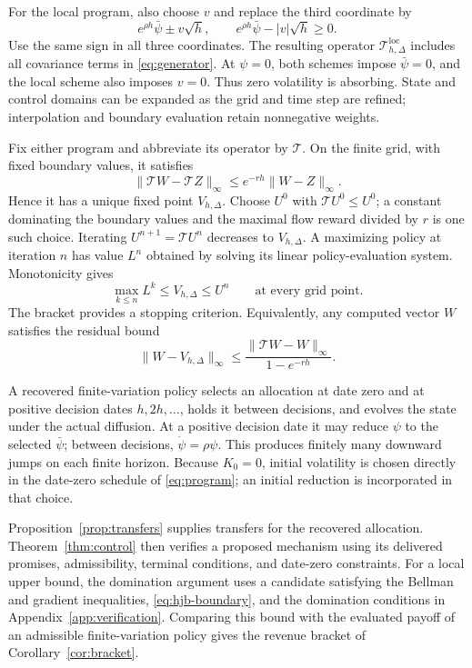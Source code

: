 \documentclass[12pt]{article}
\begin{document}
For the local program, also choose \(v\) and replace the third
coordinate by
\[
  e^{\rho h}\bar\psi\pm v\sqrt h,
  \qquad
  e^{\rho h}\bar\psi-|v|\sqrt h\geq0 .
\]
Use the same sign in all three coordinates. The resulting operator
\(\mathcal T_{h,\Delta}^{\mathrm{loc}}\) includes all covariance terms
in \eqref{eq:generator}. At \(\psi=0\), both schemes impose
\(\bar\psi=0\), and the local scheme also imposes \(v=0\).
Thus zero volatility is absorbing. State and control domains can be
expanded as the grid and time step are refined; interpolation and
boundary evaluation retain nonnegative weights.

Fix either program and abbreviate its operator by \(\mathcal T\).
On the finite grid, with fixed boundary values, it satisfies
\[
  \|\mathcal T W-\mathcal T Z\|_\infty
    \leq e^{-rh}\|W-Z\|_\infty .
\]
Hence it has a unique fixed point \(V_{h,\Delta}\).
Choose \(U^0\) with \(\mathcal T U^0\leq U^0\); a constant dominating
the boundary values and the maximal flow reward divided by \(r\)
is one such choice. Iterating
\(U^{n+1}=\mathcal T U^n\) decreases to \(V_{h,\Delta}\).
A maximizing policy at iteration \(n\) has value \(L^n\) obtained by
solving its linear policy-evaluation system. Monotonicity gives
\[
  \max_{k\leq n}L^k
      \leq V_{h,\Delta}\leq U^n
  \qquad\text{at every grid point}.
\]
The bracket provides a stopping criterion. Equivalently, any computed
vector \(W\) satisfies the residual bound
\[
  \|W-V_{h,\Delta}\|_\infty
  \leq
  \frac{\|\mathcal T W-W\|_\infty}{1-e^{-rh}} .
\]

A recovered finite-variation policy selects an allocation at date zero
and at positive decision dates \(h,2h,\ldots\), holds it between
decisions, and evolves the state under the actual diffusion. At a
positive decision date it may reduce \(\psi\) to the selected
\(\bar\psi\); between decisions, \(\dot\psi=\rho\psi\).
This produces finitely many downward jumps on each finite horizon.
Because \(K_0=0\), initial volatility is chosen directly in the
date-zero schedule of \eqref{eq:program}; an initial reduction is
incorporated in that choice.

Proposition~\ref{prop:transfers} supplies transfers for the recovered
allocation. Theorem~\ref{thm:control} then verifies a proposed
mechanism using its delivered promises, admissibility, terminal
conditions, and date-zero constraints. For a local upper bound, the
domination argument uses a candidate satisfying the Bellman and
gradient inequalities, \eqref{eq:hjb-boundary}, and the domination
conditions in Appendix~\ref{app:verification}. Comparing this bound
with the evaluated payoff of an admissible finite-variation policy
gives the revenue bracket of Corollary~\ref{cor:bracket}.
\end{document}
